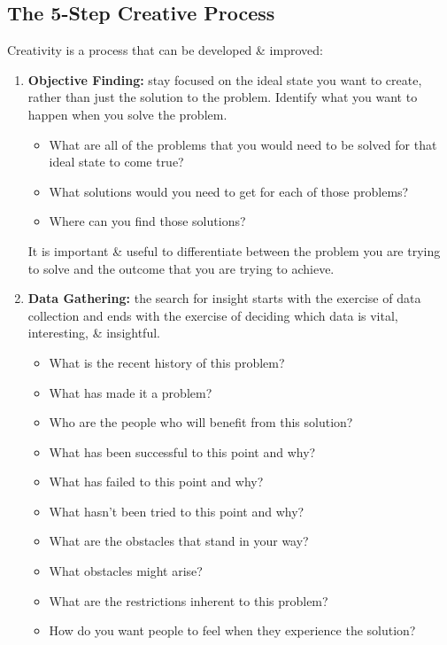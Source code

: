 \documentclass[a4paper,11pt]{article}
\begin{document}
\subsection{The 5-Step Creative Process}
Creativity is a process that can be developed \& improved:
\begin{enumerate}
    \item   \textbf{Objective Finding:} stay focused on the ideal state you want to create, rather than just the
            solution to the problem.
            Identify what you want to happen when you solve the problem.
            \begin{itemize}
                \item   What are all of the problems that you would need to be solved for that ideal state to   
                        come true?
                \item   What solutions would you need to get for each of those problems?
                \item   Where can you find those solutions?
            \end{itemize}

            It is important \& useful to differentiate between the problem you are trying to solve and the 
            outcome that you are trying to achieve.

    \item   \textbf{Data Gathering:} the search for insight starts with the exercise of data collection and ends
            with the exercise of deciding which data is vital, interesting, \& insightful.
            \begin{itemize}
                \item   What is the recent history of this problem?
                \item   What has made it a problem?
                \item   Who are the people who will benefit from this solution?
                \item   What has been successful to this point and why?
                \item   What has failed to this point and why?
                \item   What hasn't been tried to this point and why?
                \item   What are the obstacles that stand in your way?
                \item   What obstacles might arise?
                \item   What are the restrictions inherent to this problem?
                \item   How do you want people to feel when they experience the solution?
            \end{itemize}


\end{enumerate}
\end{document}
